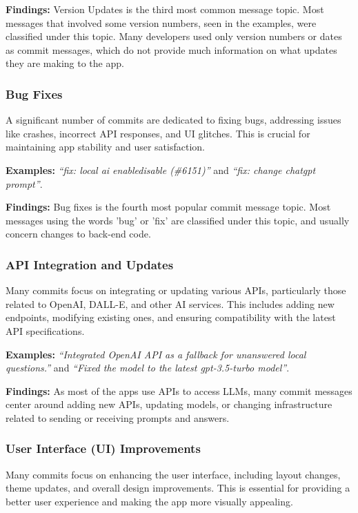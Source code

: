 \textbf{Findings: } Version Updates is the third most common message topic. Most messages that involved some version numbers, seen in the examples, were classified under this topic. 
Many developers used only version numbers or dates as commit messages, which do not provide much information on what updates they are making to the app.

\subsubsection{Bug Fixes}
A significant number of commits are dedicated to fixing bugs, addressing issues like crashes, incorrect API responses, and UI glitches. This is crucial for maintaining app stability and user satisfaction.

\textbf{Examples: } \textit{``fix: local ai enable\/disable (\#6151)''} and \textit{``fix: change chatgpt prompt''}.

\textbf{Findings: } Bug fixes is the fourth most popular commit message topic. Most messages using the words 'bug' or 'fix' are classified under this topic, and usually concern changes to back-end code.

\subsubsection{API Integration and Updates}
Many commits focus on integrating or updating various APIs, particularly those related to OpenAI, DALL-E, and other AI services. This includes adding new endpoints, modifying existing ones, and ensuring compatibility with the latest API specifications.

\textbf{Examples: } \textit{``Integrated OpenAI API as a fallback for unanswered local questions.''} and \textit{``Fixed the model to the latest gpt-3.5-turbo model''}.

\textbf{Findings: } As most of the apps use APIs to access LLMs, many commit messages center around adding new APIs, updating models, or changing infrastructure related to sending or receiving prompts and answers.

\subsubsection{User Interface (UI) Improvements}
Many commits focus on enhancing the user interface, including layout changes, theme updates, and overall design improvements. This is essential for providing a better user experience and making the app more visually appealing.

